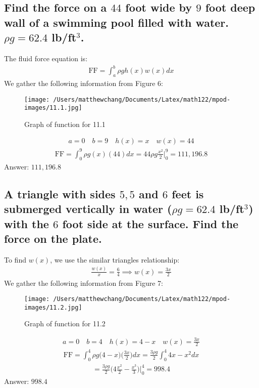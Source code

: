 \documentclass{article}
\begin{document}
\subsection{Find the force on a $44$ foot wide by $9$ foot deep wall of a swimming pool filled with water. $\rho g =62.4$ lb/ft$^3$.}
The fluid force equation is:
\begin{align*}
	\text{FF} = \int_a^b {\rho g h(x) w(x) dx}
\end{align*}
We gather the following information from Figure 6:
\begin{figure}
	\centering
	\texttt{[image: /Users/matthewchang/Documents/Latex/math122/mpod-images/11.1.jpg]}
	\caption{Graph of function for 11.1}
\end{figure}
\begin{align*}
	a = 0 \quad b = 9 \quad h(x) = x \quad w(x) = 44
\end{align*}
\begin{align*}
	\text{FF} = \int_0^9 {\rho g (x)(44) dx} = 44 \rho g \frac{x^2}{2} \bigg|_0^9 = 111,196.8
\end{align*}
Answer: $111,196.8$

\subsection{A triangle with sides $5,5$ and $6$ feet is submerged vertically in water ($\rho g =62.4$ lb/ft$^3$) with the $6$ foot side at the surface. Find the force on the plate.}
To find $w(x)$, we use the similar triangles relationship:
\begin{align*}
	\frac{w(x)}{x} = \frac{6}{4} \implies w(x) = \frac{3x}{2}
\end{align*}
We gather the following information from Figure 7:
\begin{figure}
	\centering
	\texttt{[image: /Users/matthewchang/Documents/Latex/math122/mpod-images/11.2.jpg]}
	\caption{Graph of function for 11.2}
\end{figure}
\begin{align*}
	a = 0 \quad b = 4 \quad h(x) = 4 - x \quad w(x) = \frac{3x}{2}
\end{align*}
\begin{align*}
	\text{FF} = \int_0^4 {\rho g \bigg( 4 - x \bigg) \bigg( \frac{3x}{2} \bigg) dx}
 = \frac{3 \rho g}{2} \int_0^4{4x - x^2 dx}
 \end{align*}
 \begin{align*}
	= \frac{3\rho g}{2} \bigg( 4\frac{x^2}{2} - \frac{x^3}{3} \bigg) \bigg|_0^4 = 998.4
 \end{align*}
Answer: $998.4$
\end{document}
